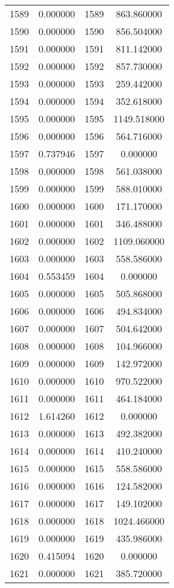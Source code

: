 \documentclass[12pt]{article}
\begin{document}
\begin{longtable}{@{}cccc@{}}
1589 & 0.000000 & 1589 & 863.860000 \\
1590 & 0.000000 & 1590 & 856.504000 \\
1591 & 0.000000 & 1591 & 811.142000 \\
1592 & 0.000000 & 1592 & 857.730000 \\
1593 & 0.000000 & 1593 & 259.442000 \\
1594 & 0.000000 & 1594 & 352.618000 \\
1595 & 0.000000 & 1595 & 1149.518000 \\
1596 & 0.000000 & 1596 & 564.716000 \\
1597 & 0.737946 & 1597 & 0.000000 \\
1598 & 0.000000 & 1598 & 561.038000 \\
1599 & 0.000000 & 1599 & 588.010000 \\
1600 & 0.000000 & 1600 & 171.170000 \\
1601 & 0.000000 & 1601 & 346.488000 \\
1602 & 0.000000 & 1602 & 1109.060000 \\
1603 & 0.000000 & 1603 & 558.586000 \\
1604 & 0.553459 & 1604 & 0.000000 \\
1605 & 0.000000 & 1605 & 505.868000 \\
1606 & 0.000000 & 1606 & 494.834000 \\
1607 & 0.000000 & 1607 & 504.642000 \\
1608 & 0.000000 & 1608 & 104.966000 \\
1609 & 0.000000 & 1609 & 142.972000 \\
1610 & 0.000000 & 1610 & 970.522000 \\
1611 & 0.000000 & 1611 & 464.184000 \\
1612 & 1.614260 & 1612 & 0.000000 \\
1613 & 0.000000 & 1613 & 492.382000 \\
1614 & 0.000000 & 1614 & 410.240000 \\
1615 & 0.000000 & 1615 & 558.586000 \\
1616 & 0.000000 & 1616 & 124.582000 \\
1617 & 0.000000 & 1617 & 149.102000 \\
1618 & 0.000000 & 1618 & 1024.466000 \\
1619 & 0.000000 & 1619 & 435.986000 \\
1620 & 0.415094 & 1620 & 0.000000 \\
1621 & 0.000000 & 1621 & 385.720000 \\

\end{longtable}
\end{document}
